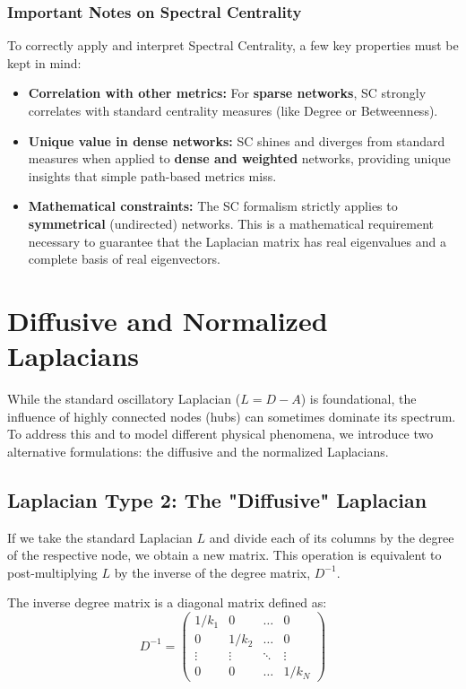 \subsubsection{Important Notes on Spectral Centrality}
To correctly apply and interpret Spectral Centrality, a few key properties must be kept in mind:
\begin{itemize}
    \item \textbf{Correlation with other metrics:} For \textbf{sparse networks}, SC strongly correlates with standard centrality measures (like Degree or Betweenness).
    \item \textbf{Unique value in dense networks:} SC shines and diverges from standard measures when applied to \textbf{dense and weighted} networks, providing unique insights that simple path-based metrics miss.
    \item \textbf{Mathematical constraints:} The SC formalism strictly applies to \textbf{symmetrical} (undirected) networks. This is a mathematical requirement necessary to guarantee that the Laplacian matrix has real eigenvalues and a complete basis of real eigenvectors.
\end{itemize}

\section{Diffusive and Normalized Laplacians}

While the standard oscillatory Laplacian (\( L = D - A \)) is foundational, the influence of highly connected nodes (hubs) can sometimes dominate its spectrum. To address this and to model different physical phenomena, we introduce two alternative formulations: the diffusive and the normalized Laplacians.

\subsection{Laplacian Type 2: The "Diffusive" Laplacian}
If we take the standard Laplacian \( L \) and divide each of its columns by the degree of the respective node, we obtain a new matrix. This operation is equivalent to post-multiplying \( L \) by the inverse of the degree matrix, \( D^{-1} \).

The inverse degree matrix is a diagonal matrix defined as:
\[
    D^{-1} =
    \begin{pmatrix}
        1/k_1  & 0      & \dots  & 0      \\
        0      & 1/k_2  & \dots  & 0      \\
        \vdots & \vdots & \ddots & \vdots \\
        0      & 0      & \dots  & 1/k_N
    \end{pmatrix}
\]

